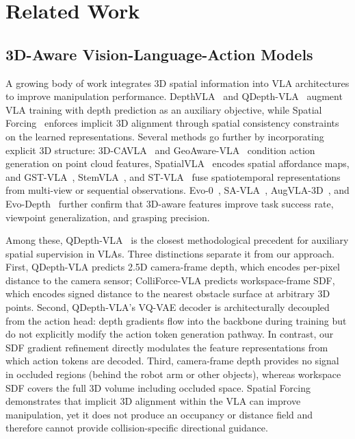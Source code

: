 \section{Related Work}\label{sec:related}

\subsection{3D-Aware Vision-Language-Action Models}

A growing body of work integrates 3D spatial information into VLA architectures to improve manipulation performance. DepthVLA~\cite{depthvla2025} and QDepth-VLA~\cite{li2025qdepth} augment VLA training with depth prediction as an auxiliary objective, while Spatial Forcing~\cite{li2025spatialforcing} enforces implicit 3D alignment through spatial consistency constraints on the learned representations. Several methods go further by incorporating explicit 3D structure: 3D-CAVLA~\cite{3dcavla2025} and GeoAware-VLA~\cite{geoaware2025} condition action generation on point cloud features, SpatialVLA~\cite{spatialvla2025} encodes spatial affordance maps, and GST-VLA~\cite{gstvla2026}, StemVLA~\cite{stemvla2026}, and ST-VLA~\cite{stvla2026} fuse spatiotemporal representations from multi-view or sequential observations. Evo-0~\cite{evo02025}, SA-VLA~\cite{savla2026}, AugVLA-3D~\cite{augvla3d2026}, and Evo-Depth~\cite{evodepth2026} further confirm that 3D-aware features improve task success rate, viewpoint generalization, and grasping precision.

Among these, QDepth-VLA~\cite{li2025qdepth} is the closest methodological precedent for auxiliary spatial supervision in VLAs. Three distinctions separate it from our approach. First, QDepth-VLA predicts 2.5D camera-frame depth, which encodes per-pixel distance to the camera sensor; ColliForce-VLA predicts workspace-frame SDF, which encodes signed distance to the nearest obstacle surface at arbitrary 3D points. Second, QDepth-VLA's VQ-VAE decoder is architecturally decoupled from the action head: depth gradients flow into the backbone during training but do not explicitly modify the action token generation pathway. In contrast, our SDF gradient refinement directly modulates the feature representations from which action tokens are decoded. Third, camera-frame depth provides no signal in occluded regions (behind the robot arm or other objects), whereas workspace SDF covers the full 3D volume including occluded space. Spatial Forcing~\cite{li2025spatialforcing} demonstrates that implicit 3D alignment within the VLA can improve manipulation, yet it does not produce an occupancy or distance field and therefore cannot provide collision-specific directional guidance.

